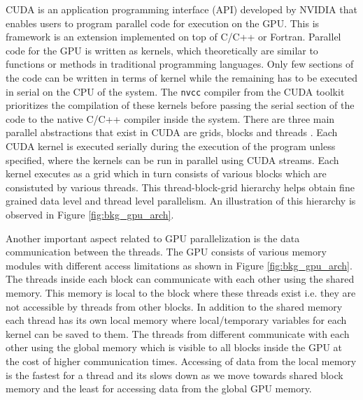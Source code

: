 \documentclass[preprint,10pt,authoryear]{elsarticle}
\begin{document}
\begin{linenumbers}
CUDA is an application programming interface (API) developed by NVIDIA \citep{NVIDIA2012} that enables 
users to program parallel code for execution on the GPU. This is framework is an 
extension implemented on top of C/C++ or Fortran. Parallel code for the GPU is written 
as kernels, which theoretically are similar to functions or methods in traditional 
programming languages. Only few sections of the code can be written in terms of kernel 
while the remaining has to be executed in serial on the CPU of the system. The \texttt{nvcc} 
compiler from the CUDA toolkit prioritizes the compilation of these kernels before 
passing the serial section of the code to the native C/C++ compiler inside the system. 
There are three main parallel abstractions that exist in CUDA are grids, blocks and 
threads \citep{santos2013}. Each CUDA kernel is executed serially during the execution 
of the program unless specified, where the kernels can be run in parallel using CUDA 
streams. Each kernel executes as a grid which in turn consists of various blocks which 
are consistuted by various threads. This thread-block-grid hierarchy helps obtain fine 
grained data level and thread level parallelism. An illustration of this hierarchy is 
observed in Figure \ref{fig:bkg_gpu_arch}.

Another important aspect related to GPU parallelization is the data communication between the threads. 
The GPU consists of various memory modules with different access limitations as shown in Figure 
\ref{fig:bkg_gpu_arch}. The threads inside each block can communicate with each other using the 
shared memory. This memory is local to the block where these threads exist i.e. they are not 
accessible by threads from other blocks. In addition to the shared memory each thread has its 
own local memory where local/temporary variables for each kernel can be saved to them. 
The threads from different communicate with each other using the global memory which is visible to 
all blocks inside the GPU at the cost of higher communication times. Accessing of data from the 
local memory is the fastest for a thread and its slows down as we move towards shared block memory 
and the least for accessing data from the global GPU memory. 



\end{linenumbers}
\end{document}
